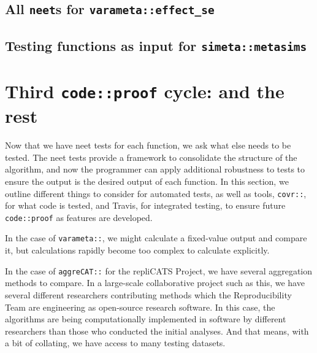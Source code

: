 \documentclass[
]{article}
\begin{document}
\hypertarget{all-neets-for-varametaeffect_se}{%
\subsection{\texorpdfstring{All \texttt{neet}s for \texttt{varameta::effect\_se}}{All neets for varameta::effect\_se}}\label{all-neets-for-varametaeffect_se}}

\hypertarget{testing-functions-as-input-for-simetametasims}{%
\subsection{\texorpdfstring{Testing functions as input for \texttt{simeta::metasims}}{Testing functions as input for simeta::metasims}}\label{testing-functions-as-input-for-simetametasims}}

\hypertarget{third-codeproof-cycle-and-the-rest}{%
\section{\texorpdfstring{Third \texttt{code::proof} cycle: and the rest}{Third code::proof cycle: and the rest}}\label{third-codeproof-cycle-and-the-rest}}

Now that we have neet tests for each function, we ask what else needs to be tested. The neet tests provide a framework to consolidate the structure of the algorithm, and now the programmer can apply additional robustness to tests to ensure the output is the desired output of each function. In this section, we outline different things to consider for automated tests, as well as tools, \texttt{covr::}, for what code is tested, and Travis, for integrated testing, to ensure future \texttt{code::proof} as features are developed.

In the case of \texttt{varameta::}, we might calculate a fixed-value output and compare it, but calculations rapidly become too complex to calculate explicitly.

In the case of \texttt{aggreCAT::} for the repliCATS Project, we have several aggregation methods to compare. In a large-scale collaborative project such as this, we have several different researchers contributing methods which the Reproducibility Team are engineering as open-source research software. In this case, the algorithms are being computationally implemented in software by different researchers than those who conducted the initial analyses. And that means, with a bit of collating, we have access to many testing datasets.
\end{document}

